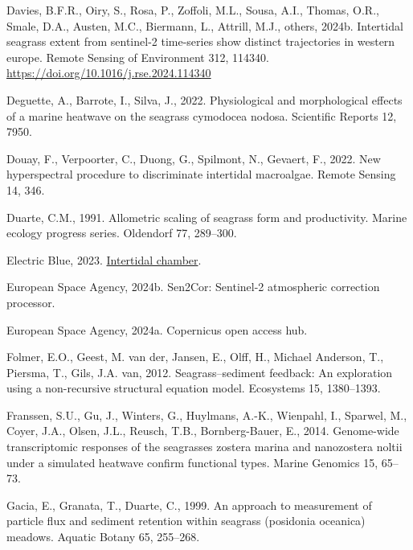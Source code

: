 \documentclass[
  letterpaper,
  DIV=11,
  numbers=noendperiod]{scrartcl}
\newlength{\cslhangindent}
\newenvironment{CSLReferences}[2] %
 {\begin{list}{}{%
  \setlength{\itemindent}{0pt}
  \setlength{\leftmargin}{0pt}
  \setlength{\parsep}{0pt}
  \ifodd #1
   \setlength{\leftmargin}{\cslhangindent}
   \setlength{\itemindent}{-1\cslhangindent}
  \fi
  \setlength{\itemsep}{#2\baselineskip}}}
 {\end{list}}
\begin{document}
\begin{CSLReferences}{1}{0}
Davies, B.F.R., Oiry, S., Rosa, P., Zoffoli, M.L., Sousa, A.I., Thomas,
O.R., Smale, D.A., Austen, M.C., Biermann, L., Attrill, M.J., others,
2024b. Intertidal seagrass extent from sentinel-2 time-series show
distinct trajectories in western europe. Remote Sensing of Environment
312, 114340. \url{https://doi.org/10.1016/j.rse.2024.114340}

Deguette, A., Barrote, I., Silva, J., 2022. Physiological and
morphological effects of a marine heatwave on the seagrass cymodocea
nodosa. Scientific Reports 12, 7950.

Douay, F., Verpoorter, C., Duong, G., Spilmont, N., Gevaert, F., 2022.
New hyperspectral procedure to discriminate intertidal macroalgae.
Remote Sensing 14, 346.

Duarte, C.M., 1991. Allometric scaling of seagrass form and
productivity. Marine ecology progress series. Oldendorf 77, 289--300.

Electric Blue, 2023.
\href{https://electricblue.eu/intertidal-chamber}{Intertidal chamber}.

European Space Agency, 2024b. Sen2Cor: Sentinel-2 atmospheric correction
processor.

European Space Agency, 2024a. Copernicus open access hub.

Folmer, E.O., Geest, M. van der, Jansen, E., Olff, H., Michael Anderson,
T., Piersma, T., Gils, J.A. van, 2012. Seagrass--sediment feedback: An
exploration using a non-recursive structural equation model. Ecosystems
15, 1380--1393.

Franssen, S.U., Gu, J., Winters, G., Huylmans, A.-K., Wienpahl, I.,
Sparwel, M., Coyer, J.A., Olsen, J.L., Reusch, T.B., Bornberg-Bauer, E.,
2014. Genome-wide transcriptomic responses of the seagrasses zostera
marina and nanozostera noltii under a simulated heatwave confirm
functional types. Marine Genomics 15, 65--73.

Gacia, E., Granata, T., Duarte, C., 1999. An approach to measurement of
particle flux and sediment retention within seagrass (posidonia
oceanica) meadows. Aquatic Botany 65, 255--268.


\end{CSLReferences}
\end{document}

